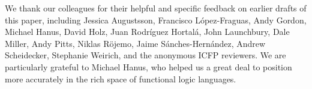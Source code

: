 \documentclass[acmsmall]{acmart}
\begin{document}
\begin{acks}                            %
  We thank our colleagues for their helpful and specific
  feedback on earlier drafts of this paper,
  including
  Jessica Augustsson,
  Francisco L\'opez-Fraguas,
  Andy Gordon,
  Michael Hanus,
  David Holz,
  Juan Rodr\'iguez Hortal\'a,
  John Launchbury,
  Dale Miller,
  Andy Pitts,
  Niklas R\"ojemo,
  Jaime S\'anches-Hern\'andez,
  Andrew Scheidecker,
  Stephanie Weirich, and the anonymous ICFP reviewers.
  We are particularly grateful to Michael Hanus, who helped us a great deal to position
  \versecalc{} more accurately in the rich space of functional logic languages.
\end{acks}



\clearpage

\appendix

\clearpage
\end{document}
